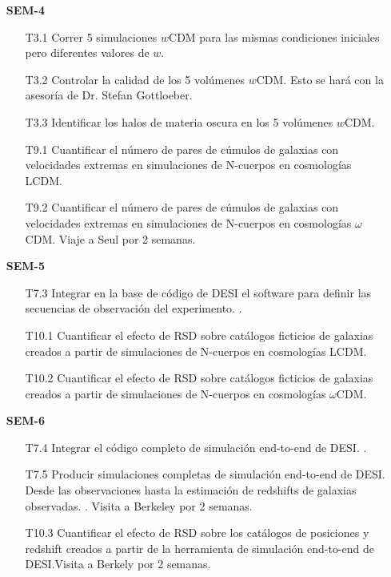 \begin{itemize}
\item[\bf SEM-4]
\begin{itemize}
\item[T3.1] \gradA Correr 5 simulaciones $w$CDM para las mismas condiciones 
  iniciales pero diferentes valores de $w$. 
\item[T3.2] \gradA Controlar la calidad de los 5 vol\'umenes $w$CDM. Esto se
  har\'a con la asesor\'ia de Dr. Stefan Gottloeber. 
\item[T3.3] \gradA Identificar los halos de materia oscura en los 5 vol\'umenes $w$CDM. 
\item[T9.1] \gradB\prof Cuantificar el n\'umero de pares de c\'umulos de galaxias  con velocidades extremas en simulaciones de N-cuerpos en
  cosmolog\'ias LCDM. 
\item[T9.2] \gradB Cuantificar el n\'umero de pares de c\'umulos de galaxias con velocidades extremas en simulaciones de N-cuerpos en
  cosmolog\'ias $\omega$CDM. Viaje a Seul por 2 semanas.
\end{itemize}


\item[\bf SEM-5]
\begin{itemize}
\item[T7.3] \prof Integrar en la base de c\'odigo de DESI el software para
  definir las secuencias de observaci\'on del experimento. \bob.
\item[T10.1] \gradB
  Cuantificar el efecto de RSD sobre cat\'alogos ficticios de
  galaxias creados a partir de simulaciones de N-cuerpos en
  cosmolog\'ias LCDM. 
\item[T10.2] \gradB Cuantificar el efecto de RSD sobre cat\'alogos ficticios de
  galaxias creados a partir de simulaciones de N-cuerpos en
  cosmolog\'ias $\omega$CDM. 
\end{itemize}

\item[\bf SEM-6]
\begin{itemize}
\item[T7.4] \prof Integrar el c\'odigo completo de simulaci\'on end-to-end
  de DESI. \bob. 
\item[T7.5] \prof Producir simulaciones completas de simulaci\'on end-to-end
  de DESI. Desde las observaciones hasta la estimaci\'on de redshifts
  de galaxias observadas. \bob. Visita a Berkeley por 2 semanas.
\item[T10.3] \gradB Cuantificar el efecto de RSD sobre los cat\'alogos de
  posiciones y redshift creados a partir de la herramienta de
  simulaci\'on end-to-end de DESI.\bob Visita a Berkely por 2 semanas.
\end{itemize}

\end{itemize}
